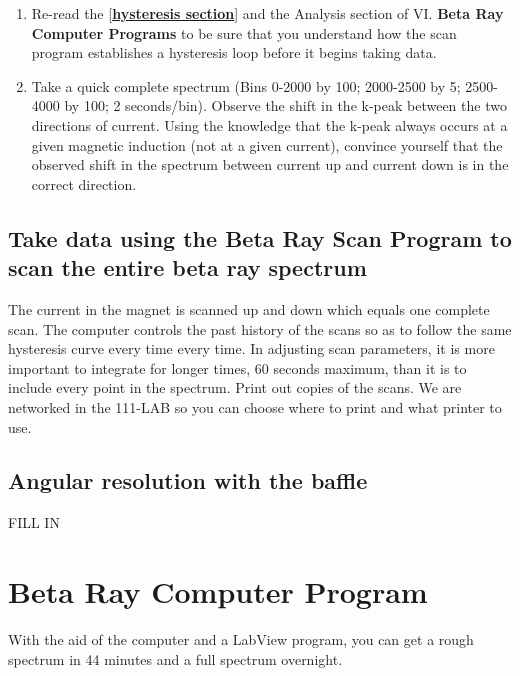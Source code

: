 \documentclass{../lab}
\begin{document}
\begin{enumerate}
    \item Re-read the [\href{https://berkeley-physics111b.github.io/appendices/hysteresis/}{\textbf{hysteresis section}}] and the Analysis section of VI. \textbf{Beta Ray Computer Programs} to be sure that you understand how the scan program establishes a hysteresis loop before it begins taking data.

    \item Take a quick complete spectrum (Bins 0-2000 by 100; 2000-2500 by 5; 2500-4000 by 100; 2 seconds/bin). Observe the shift in the k-peak between the two directions of current. Using the knowledge that the k-peak always occurs at a given magnetic induction (not at a given current), convince yourself that the observed shift in the spectrum between current up and current down is in the correct direction.
    

\end{enumerate}

\subsection{Take data using the Beta Ray Scan Program to scan the entire beta ray spectrum}

The current in the magnet is scanned up and down which equals one complete scan. The computer controls the past history of the scans so as to follow the same hysteresis curve every time every time. In adjusting scan parameters, it is more important to integrate for longer times, 60 seconds maximum, than it is to include every point in the spectrum. Print out copies of the scans. We are networked in the 111-LAB so you can choose where to print and what printer to use.

\subsection{Angular resolution with the baffle}

FILL IN

\section{Beta Ray Computer Program}

With the aid of the computer and a LabView program, you can get a rough spectrum in 44 minutes and a full spectrum overnight.
\end{document}
